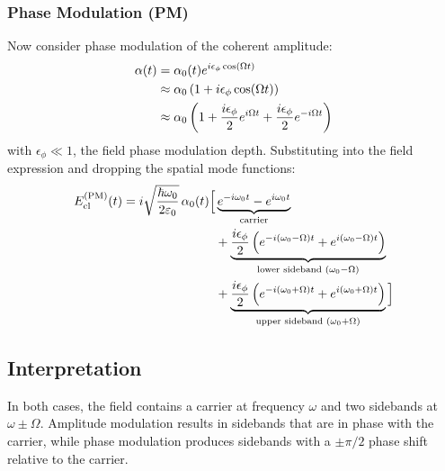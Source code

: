 \subsubsection*{Phase Modulation (PM)}
Now consider phase modulation of the coherent amplitude:
\begin{align}
  \alpha(t) &= \alpha_0(t) e^{i \epsilon_\phi \cos(\Omega t)} \\ \notag
  &\approx \alpha_0 \left(1 + i \epsilon_\phi \cos(\Omega t)\right) \\
  & \approx \alpha_0 \left(1 + \frac{i \epsilon_\phi}{2} e^{i\Omega t} + \frac{i \epsilon_\phi}{2} e^{-i\Omega t} \right)\notag
\end{align}
with $\epsilon_\phi \ll 1$, the field phase modulation depth. Substituting into the field expression and dropping the spatial mode functions:
\begin{align}
  E_{\text{cl}}^{\text{(PM)}}(t) =
  i \sqrt{\frac{\hbar \omega_0}{2 \varepsilon_0}}\, \alpha_0(t) \Big[
  &\underbrace{e^{-i\omega_0 t} - e^{i\omega_0 t}}_{\text{carrier}} \notag \\
  &+ \underbrace{\frac{i \epsilon_\phi}{2} \left( e^{-i(\omega_0 - \Omega)t} + e^{i(\omega_0 - \Omega)t} \right)}_{\text{lower sideband } (\omega_0 - \Omega)} \notag \\
  &+ \underbrace{\frac{i \epsilon_\phi}{2} \left( e^{-i(\omega_0 + \Omega)t} + e^{i(\omega_0 + \Omega)t} \right)}_{\text{upper sideband } (\omega_0 + \Omega)}
  \Big]
\end{align}
\subsection*{Interpretation}
In both cases, the field contains a carrier at frequency $\omega$ and two sidebands at $\omega \pm \Omega$. Amplitude modulation results in sidebands that are in phase with the carrier, while phase modulation produces sidebands with a $\pm \pi/2$ phase shift relative to the carrier.

